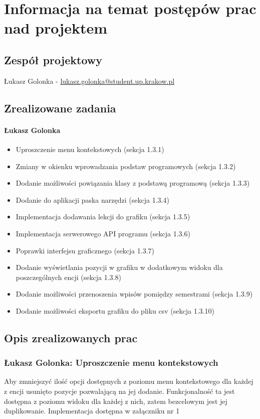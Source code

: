 \documentclass[12pt,a4paper,oneside]{article}
\theoremstyle{definition}
\numberwithin{equation}{section}
\begin{document}
\tableofcontents


\newpage

\section{Informacja na temat postępów prac nad projektem}
\subsection{Zespół projektowy}
Łukasz Golonka - \href{mailto:lukasz.golonka@student.up.krakow.pl}{lukasz.golonka@student.up.krakow.pl}
\subsection{Zrealizowane zadania}
\paragraph{Łukasz Golonka}
\begin{itemize}
\item Uproszczenie menu kontekstowych (sekcja 1.3.1)
\item Zmiany w okienku wprowadzania podstaw programowych (sekcja 1.3.2)
\item Dodanie możliwości powiązania klasy z podstawą programową (sekcja 1.3.3)
\item Dodanie do aplikacji paska narzędzi (sekcja 1.3.4)
\item Implementacja dodawania lekcji do grafiku (sekcja 1.3.5)
\item Implementacja serwerowego API programu (sekcja 1.3.6)
\item Poprawki interfejsu graficznego (sekcja 1.3.7)
\item Dodanie wyświetlania pozycji w grafiku w dodatkowym widoku dla poszczególnych encji (sekcja 1.3.8)
\item Dodanie możliwości przenoszenia wpisów pomiędzy semestrami (sekcja 1.3.9)
\item Dodanie możliwości eksportu grafiku do pliku csv (sekcja 1.3.10)
\end{itemize}

\subsection {Opis zrealizowanych prac}
\subsubsection{Łukasz Golonka: Uproszczenie menu kontekstowych}
Aby zmniejszyć ilość opcji dostępnych z poziomu menu kontekstowego dla każdej z encji usunięto pozycje pozwalającą na jej dodanie. Funkcjonalność ta jest dostępna z poziomu widoku dla każdej z nich, zatem bezcelowym jest jej  duplikowanie.
Implementacja dostępna w załączniku nr 1
\end{document}
